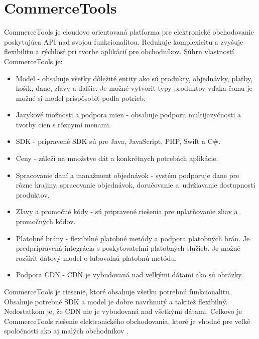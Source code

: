 \documentclass[
  printed, %
  table,   %
  lof,     %
  nolot,     %
  twoside,  
]{fithesis3}
\begin{document}
\section{CommerceTools}
CommerceTools je cloudovo orientovaná platforma pre elektronické obchodovanie poskytujúca API nad svojou funkcionalitou. Redukuje komplexicitu a zvyšuje flexibilitu a rýchlosť pri tvorbe aplikácií pre obchodníkov. Súhrn vlastností CommerceTools je:
\begin{itemize}
	\item Model - obsahuje všetky dôležité entity ako sú produkty, objednávky, platby, košík, dane, zľavy a ďalšie. Je možné vytvoriť typy produktov vďaka čomu je možné si model prispôsobiť podľa potrieb.
	\item Jazykové možnosti a podpora mien - obsahuje podporu multijazyčnosti a tvorby cien s rôznymi menami.
	\item SDK - pripravené SDK sú pre Java, JavaScript, PHP, Swift a C\#.
	\item Ceny - záleží na množstve dát a konkrétnych potrebách aplikácie.
	\item Spracovanie daní a manažment objednávok - systém podporuje dane pre rôzne krajiny, spracovanie objednávok, doručovanie a~udržiavanie dostupnosti produktov. 
	\item Zľavy a promočné kódy - sú pripravené riešenia pre uplatňovanie zliav a promočných kódov.
	\item Platobné brány - flexibilné platobné metódy a podpora platobných brán. Je predpripravená integrácia s poskytovateľmi platobných služieb. Je možné rozšíriť dátový model o ľubovoľnú platobnú metódu.
	\item Podpora CDN - CDN je vybudovaná nad veľkými dátami ako sú obrázky.
		\end{itemize}
CommerceTools je riešenie, ktoré obsahuje všetku potrebnú funkcionalitu. Obsahuje potrebné SDK a model je dobre navrhnutý a taktiež flexibilný. Nedostatkom je, že CDN nie je vybudovaná nad všetkými dátami. Celkovo je CommerceTools riešenie elektronického obchodovania, ktoré je vhodné pre veľké spoločnosti ako aj malých obchodníkov \cite{CommerceTools}.
\end{document}
